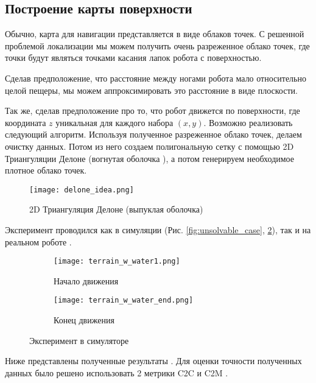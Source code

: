 \subsection{Построение карты поверхности}

Обычно, карта для навигации представляется в виде облаков точек. С решенной проблемой локализации мы можем получить очень разреженное облако точек, где точки будут являться точками касания лапок робота с поверхностью.

Сделав предположение, что расстояние между ногами робота мало относительно целой пещеры, мы можем аппроксимировать это расстояние в виде плоскости.

Так же, сделав предположение про то, что робот движется по поверхности, где координата $z$ уникальная для каждого набора $(x,y)$. Возможно реализовать следующий алгоритм. Используя полученное разреженное облако точек, делаем очистку данных. Потом из него создаем полигональную сетку с помощью 2D Триангуляции Делоне  (вогнутая оболочка ), а потом генерируем необходимое плотное облако точек. 

\begin{figure}[H]
    \centering\texttt{[image: delone\_idea.png]}
    \caption{2D Триангуляция Делоне (выпуклая оболочка)}
    \label{fig:delone_idea.png}
\end{figure}

Эксперимент проводился как в симуляции (Рис. \ref{fig:unsolvable_case}, \ref{fig:start_end_exp}), так и на реальном роботе .


\begin{figure}[H]
    \begin{subfigure}[t]{0.49\textwidth}
        \centering\texttt{[image: terrain\_w\_water1.png]}
        \caption{Начало движения}
    \end{subfigure}
    \begin{subfigure}[t]{0.49\textwidth}
        \centering\texttt{[image: terrain\_w\_water\_end.png]}
        \caption{Конец движения}
    \end{subfigure}
    \caption{Эксперимент в симуляторе}
    \label{fig:start_end_exp}
\end{figure}

Ниже представлены полученные результаты . Для оценки точности полученных данных было решено использовать 2 метрики C2C и C2M .

